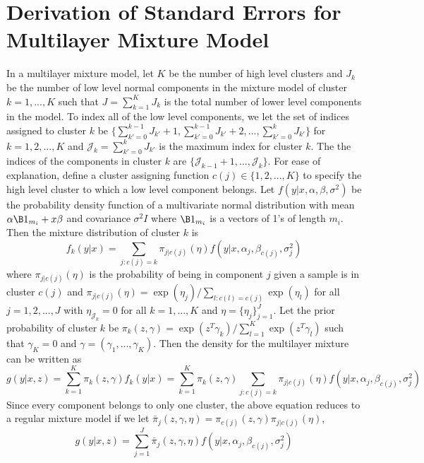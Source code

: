 \chapter{Derivation of Standard Errors for Multilayer Mixture Model}
In a multilayer mixture model, let $K$ be the number of high level clusters and $J_{k}$ be the number of low level normal components in the mixture model of cluster $k=1,...,K$ such that $J=\sum_{k=1}^{K}J_{k}$ is the total number of lower level components in the model. To index all of the low level components, we let the set of indices assigned to cluster $k$ be $\{\sum^{k-1}_{k'=0}J_{k'}+1,\sum^{k-1}_{k'=0}J_{k'}+2,...,\sum^{k}_{k'=0}J_{k'}\}$ for $k=1,2,...,K$  and $\mathcal J_{k}=\sum^{k}_{k'=0}J_{k'}$ is the maximum index for cluster $k$. The the indices of the components in cluster $k$ are $\{\mathcal J_{k-1}+1,...,\mathcal J_{k}\}$. For ease of explanation, define a cluster assigning function $c(j)\in \{1,2,...,K\}$ to specify the high level cluster to which a low level component belongs. Let $f(y|x,\alpha,\beta,\sigma^{2})$ be the probability density function of a multivariate normal distribution with mean $\alpha\B 1_{m_i}+x\beta$ and covariance $\sigma^{2}I$ where $\B 1_{m_{i}}$ is a vectors of 1's of length $m_{i}$. Then the mixture distribution of cluster $k$ is
$$f_{k}(y|x) = \sum_{j: c(j) = k} \pi_{j|c(j)}(\eta)f(y|x,\alpha_{j},\beta_{c(j)},\sigma^{2}_{j})$$
where $\pi_{j|c(j)}(\eta)$ is the probability of being in component $j$ given a sample is in cluster $c(j)$ and $\pi_{j|c(j)}(\eta)=\exp(\eta_{j})/\sum_{l:c(l)=c(j)} \exp(\eta_{l})$ for all $j=1,2,...,J$ with $\eta_{\mathcal J_{k}}=0$ for all $k=1,...,K$ and $\eta=\{\eta_{j}\}_{j=1}^{J}$. Let the prior probability of cluster $k$ be $\pi_{k}(z,\gamma)=\exp(z^{T}\gamma_{k})/\sum^{K}_{l=1}\exp(z^{T}\gamma_{l})$ such that $\gamma_{K}=0$ and $\gamma=(\gamma_{1},...,\gamma_{K})$. Then the density for the multilayer mixture can be written as
$$g(y|x,z) = \sum_{k=1}^{K}\pi_{k}(z,\gamma)f_{k}(y|x) = \sum_{k=1}^{K}\pi_{k}(z,\gamma)\sum_{j: c(j) = k} \pi_{j|c(j)}(\eta)f(y|x,\alpha_{j},\beta_{c(j)},\sigma^{2}_{j})$$
Since every component belongs to only one cluster, the above equation reduces to a regular mixture model if we let $\bar{\pi}_{j}(z,\gamma,\eta)=\pi_{c(j)}(z,\gamma)\pi_{j|c(j)}(\eta)$,
$$g(y|x,z) = \sum_{j=1}^{J}\bar{\pi}_{j}(z,\gamma,\eta)f(y|x,\alpha_{j},\beta_{c(j)},\sigma^{2}_{j})$$
